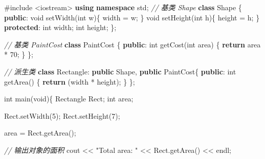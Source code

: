 \documentclass[
]{article}
\newenvironment{Shaded}{}{}
\newcommand{\CommentTok}[1]{\textcolor[rgb]{0.38,0.63,0.69}{\textit{#1}}}
\newcommand{\ControlFlowTok}[1]{\textcolor[rgb]{0.00,0.44,0.13}{\textbf{#1}}}
\newcommand{\DataTypeTok}[1]{\textcolor[rgb]{0.56,0.13,0.00}{#1}}
\newcommand{\DecValTok}[1]{\textcolor[rgb]{0.25,0.63,0.44}{#1}}
\newcommand{\ImportTok}[1]{#1}
\newcommand{\KeywordTok}[1]{\textcolor[rgb]{0.00,0.44,0.13}{\textbf{#1}}}
\newcommand{\NormalTok}[1]{#1}
\newcommand{\OperatorTok}[1]{\textcolor[rgb]{0.40,0.40,0.40}{#1}}
\newcommand{\PreprocessorTok}[1]{\textcolor[rgb]{0.74,0.48,0.00}{#1}}
\newcommand{\StringTok}[1]{\textcolor[rgb]{0.25,0.44,0.63}{#1}}
\begin{document}
\begin{Shaded}
\begin{Highlighting}[]
\PreprocessorTok{\#include }\ImportTok{\textless{}iostream\textgreater{}}
\KeywordTok{using} \KeywordTok{namespace}\NormalTok{ std}\OperatorTok{;}
\CommentTok{// 基类 Shape}
\KeywordTok{class}\NormalTok{ Shape }\OperatorTok{\{}
   \KeywordTok{public}\OperatorTok{:}
      \DataTypeTok{void}\NormalTok{ setWidth}\OperatorTok{(}\DataTypeTok{int}\NormalTok{ w}\OperatorTok{)\{}
\NormalTok{         width }\OperatorTok{=}\NormalTok{ w}\OperatorTok{;}
      \OperatorTok{\}}
      \DataTypeTok{void}\NormalTok{ setHeight}\OperatorTok{(}\DataTypeTok{int}\NormalTok{ h}\OperatorTok{)\{}
\NormalTok{         height }\OperatorTok{=}\NormalTok{ h}\OperatorTok{;}
      \OperatorTok{\}}
   \KeywordTok{protected}\OperatorTok{:}
      \DataTypeTok{int}\NormalTok{ width}\OperatorTok{;}
      \DataTypeTok{int}\NormalTok{ height}\OperatorTok{;}
\OperatorTok{\};}
      
\CommentTok{// 基类 PaintCost}
\KeywordTok{class}\NormalTok{ PaintCost }\OperatorTok{\{}
   \KeywordTok{public}\OperatorTok{:}
      \DataTypeTok{int}\NormalTok{ getCost}\OperatorTok{(}\DataTypeTok{int}\NormalTok{ area}\OperatorTok{)}
      \OperatorTok{\{}
         \ControlFlowTok{return}\NormalTok{ area }\OperatorTok{*} \DecValTok{70}\OperatorTok{;}
      \OperatorTok{\}}
\OperatorTok{\};}

\CommentTok{// 派生类}
\KeywordTok{class}\NormalTok{ Rectangle}\OperatorTok{:} \KeywordTok{public}\NormalTok{ Shape}\OperatorTok{,} \KeywordTok{public}\NormalTok{ PaintCost}\OperatorTok{\{}
   \KeywordTok{public}\OperatorTok{:}
      \DataTypeTok{int}\NormalTok{ getArea}\OperatorTok{()}
      \OperatorTok{\{} 
         \ControlFlowTok{return} \OperatorTok{(}\NormalTok{width }\OperatorTok{*}\NormalTok{ height}\OperatorTok{);} 
      \OperatorTok{\}}
\OperatorTok{\};}

\DataTypeTok{int}\NormalTok{ main}\OperatorTok{(}\DataTypeTok{void}\OperatorTok{)\{}
\NormalTok{   Rectangle Rect}\OperatorTok{;}
   \DataTypeTok{int}\NormalTok{ area}\OperatorTok{;}

\NormalTok{   Rect}\OperatorTok{.}\NormalTok{setWidth}\OperatorTok{(}\DecValTok{5}\OperatorTok{);}
\NormalTok{   Rect}\OperatorTok{.}\NormalTok{setHeight}\OperatorTok{(}\DecValTok{7}\OperatorTok{);}

\NormalTok{   area }\OperatorTok{=}\NormalTok{ Rect}\OperatorTok{.}\NormalTok{getArea}\OperatorTok{();}

   \CommentTok{// 输出对象的面积}
\NormalTok{   cout }\OperatorTok{\textless{}\textless{}} \StringTok{"Total area: "} \OperatorTok{\textless{}\textless{}}\NormalTok{ Rect}\OperatorTok{.}\NormalTok{getArea}\OperatorTok{()} \OperatorTok{\textless{}\textless{}}\NormalTok{ endl}\OperatorTok{;}


\end{Highlighting}
\end{Shaded}
\end{document}
